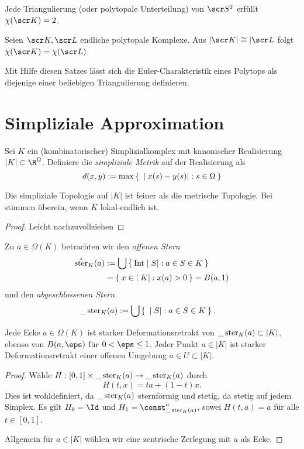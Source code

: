 \begin{st}
	Jede Triangulierung (oder polytopale Unterteilung) von $\scr S^2$ erfüllt $\chi(\scr K) = 2$.
\end{st}

\begin{st}
	Seien $\scr K, \scr L$ endliche polytopale Komplexe.
	Aus $|\scr K| \homeomorphic |\scr L$ folgt $\chi(\scr K) = \chi(\scr L)$.
	\begin{note}
		Mit Hilfe diesen Satzes lässt sich die Euler-Charakteristik eines Polytops als diejenige einer beliebigen Triangulierung definieren.
	\end{note}
\end{st}


\section{Simpliziale Approximation}


\begin{df}
	Sei $K$ ein (kombinatorischer) Simplizialkomplex mit kanonischer Realisierung $|K| \subset \R^{\Omega}$.
	Definiere die \emph{simpliziale Metrik} auf der Realisierung als
	\[
		d(x,y) :=
		\max \Set{ |x(s) - y(s)| : s \in \Omega }
	\]
\end{df}

\begin{st}
	Die simpliziale Topologie auf $|K|$ ist feiner als die metrische Topologie.
	Bei stimmen überein, wenn $K$ lokal-endlich ist.
	\begin{proof}
		Leicht nachzuvollziehen
	\end{proof}
\end{st}

\begin{df}
	Zu $a \in \Omega(K)$ betrachten wir den \emph{offenen Stern}
	\begin{align*}
		\mathring {\operatorname{ster}}_K(a)
		&:= \bigcup \Set{  \operatorname{Int} |S| : a \in S \in K } \\
		&= \Set{ x \in |K| : x(a) > 0 }
		= B(a, 1)
	\end{align*}
	und den \emph{abgeschlossenen Stern}
	\begin{align*}
		\_\operatorname{ster}_K(a)
		&:= \bigcup \Set{ |S| : a \in S \in K }.
	\end{align*}
\end{df}

\begin{st}
	Jede Ecke $a \in \Omega(K)$ ist starker Deformationsretrakt von $\_\operatorname{ster}_K(a) \subset |K|$, ebenso von $B(a, \eps)$ für $0 < \eps \le 1$.
	Jeder Punkt $a \in |K|$ ist starker Deformationsretrakt einer offenen Umgebung $a \in U \subset |K|$.
	\begin{proof}
		Wähle $H: [0,1] \times \_\operatorname{ster}_K(a) \to \_\operatorname{ster}_K(a)$ durch
		\[
			H(t, x) = ta + (1-t) x.
		\]
		Dies ist wohldefiniert, da $\_\operatorname{ster}_K(a)$ sternförmig und stetig, da stetig auf jedem Simplex.
		Es gilt $H_0 = \Id$ und $H_1 = \const_{\_\stern_K(a)}^a$, sowei $H(t,a) = a$ für alle $t \in [0,1]$.

		Allgemein für $a \in |K|$ wählen wir eine zentrische Zerlegung mit $a$ als Ecke.
	\end{proof}
\end{st}

